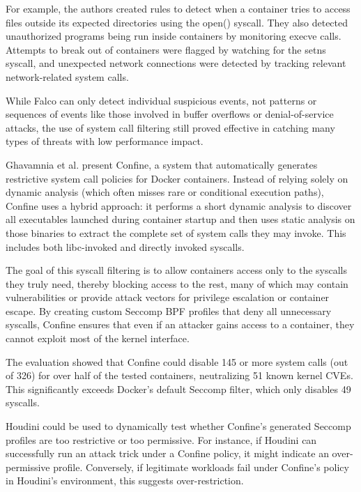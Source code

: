 \begin{doublespace}
For example, the authors created rules to detect when a container tries to access files outside its expected directories using the open() syscall. They also detected unauthorized programs being run inside containers by monitoring execve calls. Attempts to break out of containers were flagged by watching for the setns syscall, and unexpected network connections were detected by tracking relevant network-related system calls.

While Falco can only detect individual suspicious events, not patterns or sequences of events like those involved in buffer overflows or denial-of-service attacks, the use of system call filtering still proved effective in catching many types of threats with low performance impact.

Ghavamnia et al. \cite{ghavamnia2020confine} present Confine, a system that automatically generates restrictive system call policies for Docker containers. Instead of relying solely on dynamic analysis (which often misses rare or conditional execution paths), Confine uses a hybrid approach: it performs a short dynamic analysis to discover all executables launched during container startup and then uses static analysis on those binaries to extract the complete set of system calls they may invoke. This includes both libc-invoked and directly invoked syscalls.

The goal of this syscall filtering is to allow containers access only to the syscalls they truly need, thereby blocking access to the rest, many of which may contain vulnerabilities or provide attack vectors for privilege escalation or container escape. By creating custom Seccomp BPF profiles that deny all unnecessary syscalls, Confine ensures that even if an attacker gains access to a container, they cannot exploit most of the kernel interface.

The evaluation showed that Confine could disable 145 or more system calls (out of 326) for over half of the tested containers, neutralizing 51 known kernel CVEs. This significantly exceeds Docker’s default Seccomp filter, which only disables 49 syscalls.

Houdini could be used to dynamically test whether Confine’s generated Seccomp profiles are too restrictive or too permissive. For instance, if Houdini can successfully run an attack trick under a Confine policy, it might indicate an over-permissive profile. Conversely, if legitimate workloads fail under Confine’s policy in Houdini’s environment, this suggests over-restriction.


\end{doublespace}
